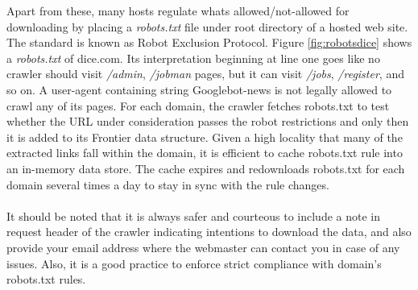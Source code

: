 \noindent
Apart from these, many hosts regulate whats allowed/not-allowed for downloading by placing a \textit{robots.txt} file under root directory of a hosted web site. The standard is known as Robot Exclusion Protocol.
Figure \ref{fig:robotsdice} shows a \textit{robots.txt} of dice.com. Its interpretation beginning at line one goes like no crawler should visit \textit{/admin}, \textit{/jobman} pages, but it can visit \textit{/jobs},
\textit{/register}, and so on. A user-agent containing string Googlebot-news is not legally allowed to
crawl  any of its pages. For each domain, the crawler fetches robots.txt to test whether the URL under consideration passes the robot restrictions and only then it is added to its Frontier data structure. Given a
high locality that many of the extracted links fall within the domain, it is efficient to cache robots.txt rule into an in-memory data store. The cache expires and redownloads robots.txt for each domain several times a day to stay in sync with the rule changes.
\\
\\
It should be noted that it is always safer and courteous to include a note in request header of the crawler indicating intentions to download the data, and also provide your email address where the webmaster can contact you in case of any issues. Also, it is a good practice to enforce strict compliance with domain's robots.txt rules.

